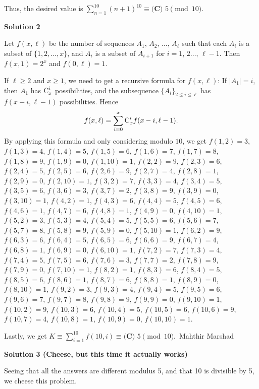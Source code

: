 \begin{enumerate}
 Thus, the desired value is $\sum_{n=1}^{10}(n+1)^{10}\equiv \boxed{\textbf{(C) } 5}\pmod{10}$.

 



\textbf{Solution 2}

Let $f(x,\ell)$ be the number of sequences $A_1$, $A_2$, $\dots$, $A_\ell$ such that each $A_i$ is a subset of $\{1, 2,\dots,x\}$, and $A_i$ is a subset of $A_{i+1}$ for $i=1$, $2\dots$, $\ell-1$. Then $f(x,1)=2^x$ and $f(0,\ell)=1$.

 If $\ell\ge2$ and $x\ge1$, we need to get a recursive formula for $f(x,\ell)$: If $|A_1|=i$, then $A_1$ has $\text C_x^i$ possibilities, and the subsequence $\{A_i\}_{2\le i\le\ell}$ has $f(x-i,\ell-1)$ possibilities. Hence
 \[f(x,\ell)=\sum_{i=0}^x\text C_x^if(x-i,\ell-1).\]By applying this formula and only considering  modulo $10$, we get $f(1,2)=3$, $f(1,3)=4$, $f(1,4)=5$, $f(1,5)=6$, $f(1,6)=7$, $f(1,7)=8$, $f(1,8)=9$, $f(1,9)=0$, $f(1,10)=1$, $f(2,2)=9$, $f(2,3)=6$, $f(2,4)=5$, $f(2,5)=6$, $f(2,6)=9$, $f(2,7)=4$, $f(2,8)=1$, $f(2,9)=0$, $f(2,10)=1$, $f(3,2)=7$, $f(3,3)=4$, $f(3,4)=5$, $f(3,5)=6$, $f(3,6)=3$, $f(3,7)=2$, $f(3,8)=9$, $f(3,9)=0$, $f(3,10)=1$, $f(4,2)=1$, $f(4,3)=6$, $f(4,4)=5$, $f(4,5)=6$, $f(4,6)=1$, $f(4,7)=6$, $f(4,8)=1$, $f(4,9)=0$, $f(4,10)=1$, $f(5,2)=3$, $f(5,3)=4$, $f(5,4)=5$, $f(5,5)=6$, $f(5,6)=7$, $f(5,7)=8$, $f(5,8)=9$, $f(5,9)=0$, $f(5,10)=1$, $f(6,2)=9$, $f(6,3)=6$, $f(6,4)=5$, $f(6,5)=6$, $f(6,6)=9$, $f(6,7)=4$, $f(6,8)=1$, $f(6,9)=0$, $f(6,10)=1$, $f(7,2)=7$, $f(7,3)=4$, $f(7,4)=5$, $f(7,5)=6$, $f(7,6)=3$, $f(7,7)=2$, $f(7,8)=9$, $f(7,9)=0$, $f(7,10)=1$, $f(8,2)=1$, $f(8,3)=6$, $f(8,4)=5$, $f(8,5)=6$, $f(8,6)=1$, $f(8,7)=6$, $f(8,8)=1$, $f(8,9)=0$, $f(8,10)=1$, $f(9,2)=3$, $f(9,3)=4$, $f(9,4)=5$, $f(9,5)=6$, $f(9,6)=7$, $f(9,7)=8$, $f(9,8)=9$, $f(9,9)=0$, $f(9,10)=1$, $f(10,2)=9$, $f(10,3)=6$, $f(10,4)=5$, $f(10,5)=6$, $f(10,6)=9$, $f(10,7)=4$, $f(10,8)=1$, $f(10,9)=0$, $f(10,10)=1$.

 Lastly, we get $K\equiv\textstyle\sum\limits_{i=1}^{10}f(10,i)\equiv\boxed{\textbf{(C) } 5}\pmod{10}$.~Mahthir Marshad

 



\textbf{Solution 3 (Cheese, but this time it actually works)}

Seeing that all the answers are different modulus 5, and that 10 is divisible by 5, we cheese this problem. 


\end{enumerate}
